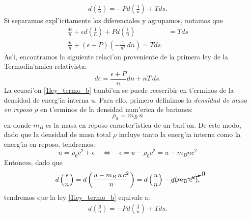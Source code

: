\begin{align}\label{1ley_termo_b}
\boxed{d\left(\frac{\epsilon}{n}\right)=-Pd\left(\frac{1}{n}\right)+Tds.}
\end{align}
Si separamos expl'icitamente los diferenciales y agrupamos, notamos que
\begin{align}
\frac{d\epsilon}{n}+\epsilon d\left(\frac{1}{n}\right)+Pd\left(\frac{1}{n}\right)&=Tds\\
\frac{d\epsilon}{n}+(\epsilon +P)\left(-\frac{1}{n^2}\,dn\right)=Tds.
\end{align}
As'i, encontramos la siguiente relaci'on proveniente de la primera ley de la Termodin'amica relativista:
\begin{equation}\label{1leytermo}
\boxed{d\epsilon=\frac{\epsilon+P}{n}dn+nT\,ds.}
\end{equation}
La ecuaci'on \eqref{1ley_termo_b} tambi'en se puede reescribir en t'erminos de la densidad de energ'ia interna $u$. Para ello, primero definimos la \textit{densidad de masa en reposo} $\rho$ en t'erminos de la densidad num'erica de bariones:
\begin{equation}\label{masa_reposo}
\rho_0=m_B\,n
\end{equation}
en donde $m_B$ es la masa en reposo caracter'istica de un bari'on.
De este modo, dado que la densidad de masa total $\rho$ incluye tanto la energ'ia interna como la energ'ia en reposo, tendremos:
\begin{equation}\label{energia_interna_y_densidad}
\boxed{u=\rho_0 c^2+\epsilon \quad\Leftrightarrow\quad \epsilon=u-\rho_0c^2=u-m_B nc^2}
\end{equation}
Entonces, dado que
\begin{equation}
d\left(\frac{\epsilon}{n}\right)=d\left(\frac{u-m_B\,n\,c^2}{n}\right)=d\left(\frac{u}{n}\right)-\cancelto{0}{d(m_B\,c^2)},
\end{equation}
tendremos que la ley \eqref{1ley_termo_b} equivale a:
\begin{align}
\boxed{d\left(\frac{u}{n}\right)=-Pd\left(\frac{1}{n}\right)+Tds.}\label{1ley_termo}
\end{align}
